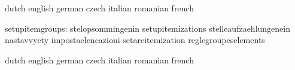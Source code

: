 \stopcommands



\startcommands                    dutch                            english
                                  german                           czech
                                  italian                          romanian
                                  french

                 setupitemgroups: stelopsommingenin                setupitemizations
                                  stelleaufzaehlungenein           nastavvycty
                                  impostaelencazioni               setareitemization
                                  reglegroupeselements

\stopcommands




\startcommands                    dutch                            english
                                  german                           czech
                                  italian                          romanian
                                  french

